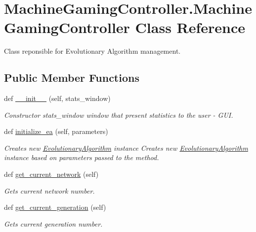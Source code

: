 \hypertarget{classMachineGamingController_1_1MachineGamingController}{}\section{Machine\+Gaming\+Controller.\+Machine\+Gaming\+Controller Class Reference}
\label{classMachineGamingController_1_1MachineGamingController}


Class reponsible for Evolutionary Algorithm management.  


\subsection*{Public Member Functions}
\begin{DoxyCompactItemize}
\item 
def \hyperlink{classMachineGamingController_1_1MachineGamingController_a0552527740e7e5e6a58d2babbe00387a}{\+\_\+\+\_\+init\+\_\+\+\_\+} (self, stats\+\_\+window)
\begin{DoxyCompactList}\small\item\em Constructor  stats\+\_\+window window that present statistics to the user -\/ G\+UI. \end{DoxyCompactList}\item 
def \hyperlink{classMachineGamingController_1_1MachineGamingController_a7eebd5e59bc078c01bf3057684c54547}{initialize\+\_\+ea} (self, parameters)
\begin{DoxyCompactList}\small\item\em Creates new \hyperlink{classEvolutionaryAlgorithm}{Evolutionary\+Algorithm} instance Creates new \hyperlink{classEvolutionaryAlgorithm}{Evolutionary\+Algorithm} instance based on parameters passed to the method. \end{DoxyCompactList}\item 
def \hyperlink{classMachineGamingController_1_1MachineGamingController_aa5f25a8c5bf4cbc0e9dc4f6ad7c1cce5}{get\+\_\+current\+\_\+network} (self)
\begin{DoxyCompactList}\small\item\em Gets current network number. \end{DoxyCompactList}\item 
def \hyperlink{classMachineGamingController_1_1MachineGamingController_ac90fcf35b4ae810843b5420e1160b0c4}{get\+\_\+current\+\_\+generation} (self)
\begin{DoxyCompactList}\small\item\em Gets current generation number. \end{DoxyCompactList}\item 

\end{DoxyCompactItemize}
